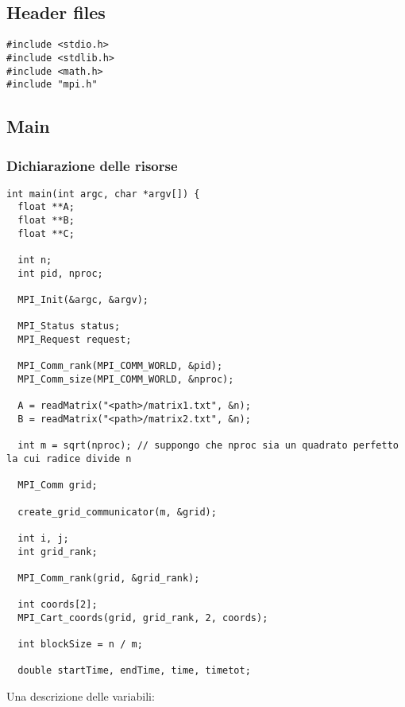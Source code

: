\subsection{Header files}
\begin{lstlisting}
#include <stdio.h>
#include <stdlib.h>
#include <math.h>
#include "mpi.h"
\end{lstlisting}

\subsection{Main}
\subsubsection{Dichiarazione delle risorse}
\begin{lstlisting}
int main(int argc, char *argv[]) {
  float **A;
  float **B;
  float **C;

  int n;
  int pid, nproc;

  MPI_Init(&argc, &argv);

  MPI_Status status;
  MPI_Request request;

  MPI_Comm_rank(MPI_COMM_WORLD, &pid);
  MPI_Comm_size(MPI_COMM_WORLD, &nproc);

  A = readMatrix("<path>/matrix1.txt", &n);
  B = readMatrix("<path>/matrix2.txt", &n);

  int m = sqrt(nproc); // suppongo che nproc sia un quadrato perfetto la cui radice divide n

  MPI_Comm grid;

  create_grid_communicator(m, &grid);

  int i, j;
  int grid_rank;

  MPI_Comm_rank(grid, &grid_rank);

  int coords[2];
  MPI_Cart_coords(grid, grid_rank, 2, coords);

  int blockSize = n / m;

  double startTime, endTime, time, timetot;
\end{lstlisting}
Una descrizione delle variabili:
